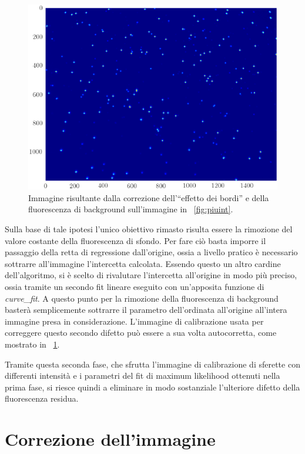 \begin{figure}[p]
 \centering
 \includegraphics[scale=.64]{img/CAP3piuintcorr.png}
 \caption{\small{Immagine risultante dalla correzione dell'``effetto dei bordi'' e della fluorescenza di background sull'immagine in \figurename~\ref{fig:piuint}.}}
 \label{fig:piuintcorr}
\end{figure}

Sulla base di tale ipotesi l'unico obiettivo rimasto risulta essere la rimozione del valore costante della fluorescenza di sfondo. 
Per fare ciò basta imporre il passaggio della retta di regressione dall'origine, ossia a livello pratico è necessario sottrarre all'immagine l'intercetta calcolata. 
Essendo questo un altro cardine dell'algoritmo, si è scelto di rivalutare l'intercetta all'origine in modo più preciso, ossia tramite un secondo fit lineare eseguito con un'apposita funzione di \textit{curve\_fit}.
A questo punto per la rimozione della fluorescenza di background basterà semplicemente sottrarre il parametro dell'ordinata all'origine all'intera immagine presa in considerazione. 
L'immagine di calibrazione usata per correggere questo secondo difetto può essere a sua volta autocorretta, come mostrato in \figurename~\ref{fig:piuintcorr}.

Tramite questa seconda fase, che sfrutta l'immagine di calibrazione di sferette con differenti intensità e i parametri del fit di maximum likelihood ottenuti nella prima fase, si riesce quindi a eliminare in modo sostanziale l'ulteriore difetto della fluorescenza residua. 


\section{Correzione dell'immagine}

